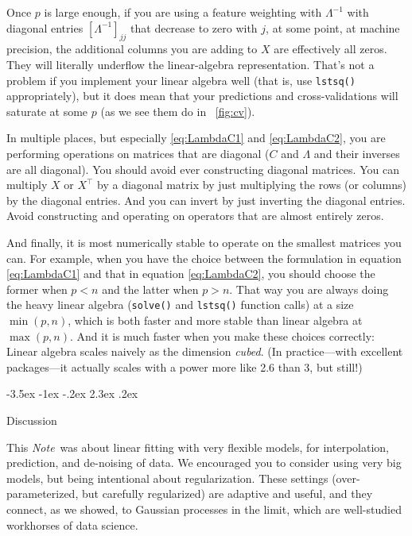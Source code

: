 \documentclass[12pt,letterpaper]{article}
\makeatletter
\renewcommand\section{\@startsection {section}{1}{\z@}%
  {-3.5ex \@plus -1ex \@minus -.2ex}%
  {2.3ex \@plus.2ex}%
  {\raggedright\normalfont\Large\bfseries}}
\newcommand{\documentname}{\textsl{Note}}
\newcommand{\code}[1]{\texttt{#1}}
\makeatother
\begin{document}
Once $p$ is large enough, if you are using a feature weighting with $\Lambda^{-1}$ with diagonal entries $[\Lambda^{-1}]_{jj}$ that decrease to zero with $j$, at some point, at machine precision, the additional columns you are adding to $X$ are effectively all zeros.
They will literally underflow the linear-algebra representation.
That's not a problem if you implement your linear algebra well (that is, use \code{lstsq()} appropriately), but it does mean that your predictions and cross-validations will saturate at some $p$ (as we see them do in \figurename~\ref{fig:cv}).

In multiple places, but especially \eqref{eq:LambdaC1} and \eqref{eq:LambdaC2}, you are performing operations on matrices that are diagonal ($C$ and $\Lambda$ and their inverses are all diagonal).
You should avoid ever constructing diagonal matrices.
You can multiply $X$ or $X^\top$ by a diagonal matrix by just multiplying the rows (or columns) by the diagonal entries.
And you can invert by just inverting the diagonal entries.
Avoid constructing and operating on operators that are almost entirely zeros.

And finally, it is most numerically stable to operate on the smallest matrices you can.
For example, when you have the choice between the formulation in equation \eqref{eq:LambdaC1} and that in equation \eqref{eq:LambdaC2}, you should choose the former when $p<n$ and the latter when $p>n$.
That way you are always doing the heavy linear algebra (\code{solve()} and \code{lstsq()} function calls) at a size $\min(p, n)$, which is both faster and more stable than linear algebra at $\max(p, n)$. And it is much faster when you make these choices correctly:
Linear algebra scales naively as the dimension \emph{cubed}.
(In practice---with excellent packages---it actually scales with a power more like 2.6 than 3, but still!)

\section{Discussion}\label{sec:discussion}

This \documentname\ was about linear fitting with very flexible models, for interpolation, prediction, and de-noising of data.
We encouraged you to consider using very big models, but being intentional about regularization.
These settings (over-parameterized, but carefully regularized) are adaptive and useful, and they connect, as we showed, to Gaussian processes in the limit, which are well-studied workhorses of data science.
\end{document}
